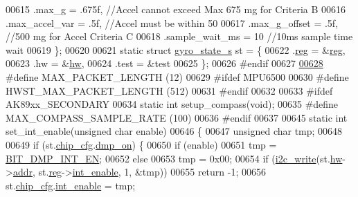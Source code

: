 \begin{DoxyCode}
{{00615     .max\_g          = .675f, \textcolor{comment}{//Accel cannot exceed Max 675 mg for Criteria B}
00616     .max\_accel\_var  = .5f,  \textcolor{comment}{//Accel must be within 50%
00617     .max\_g\_offset   = .5f,   \textcolor{comment}{//500 mg for Accel Criteria C}
00618     .sample\_wait\_ms = 10    \textcolor{comment}{//10ms sample time wait}
00619 \};
00620 
00621 \textcolor{keyword}{static} \textcolor{keyword}{struct }\hyperlink{structgyro__state__s}{gyro\_state\_s} st = \{
00622     .\hyperlink{structgyro__state__s_ae857e1285c583b7438a208edd691a38e}{reg} = &\hyperlink{inv__mpu_8c_a5448c351fc95ff052b110eee80e5f75c}{reg},
00623     .hw = &\hyperlink{inv__mpu_8c_a7fefd0bb47e09b7e39e25e9795cd7edc}{hw},
00624     .test = &test
00625 \};
00626 \textcolor{preprocessor}{#endif}
00627 
\hypertarget{inv__mpu_8c_source.tex_l00628}{}\hyperlink{inv__mpu_8c_a973c680573b37fc359fc68d0707da355}{00628} \textcolor{preprocessor}{#define MAX\_PACKET\_LENGTH (12)}
00629 \textcolor{preprocessor}{#ifdef MPU6500}
00630 \textcolor{preprocessor}{#define HWST\_MAX\_PACKET\_LENGTH (512)}
00631 \textcolor{preprocessor}{#endif}
00632 
00633 \textcolor{preprocessor}{#ifdef AK89xx\_SECONDARY}
00634 \textcolor{keyword}{static} \textcolor{keywordtype}{int} setup\_compass(\textcolor{keywordtype}{void});
00635 \textcolor{preprocessor}{#define MAX\_COMPASS\_SAMPLE\_RATE (100)}
00636 \textcolor{preprocessor}{#endif}
00637 
00645 \textcolor{keyword}{static} \textcolor{keywordtype}{int} set\_int\_enable(\textcolor{keywordtype}{unsigned} \textcolor{keywordtype}{char} enable)
00646 \{
00647     \textcolor{keywordtype}{unsigned} \textcolor{keywordtype}{char} tmp;
00648 
00649     \textcolor{keywordflow}{if} (st.\hyperlink{structgyro__state__s_ac895217592e2084bd520b0be8e9d20ee}{chip\_cfg}.\hyperlink{structchip__cfg__s_a49fb51079238683b21264827348b5968}{dmp\_on}) \{
00650         \textcolor{keywordflow}{if} (enable)
00651             tmp = \hyperlink{inv__mpu_8c_a4dc5309ed09fc683d8e5a247feaad69d}{BIT\_DMP\_INT\_EN};
00652         \textcolor{keywordflow}{else}
00653             tmp = 0x00;
00654         \textcolor{keywordflow}{if} (\hyperlink{_i2_c_8c_ac0f145afe8d662af199043939f4398d6}{i2c\_write}(st.\hyperlink{structgyro__state__s_a5bac30a96752691e4cc723735060e360}{hw}->\hyperlink{structhw__s_a4c34a946600e9d68b6355d23f54d291b}{addr}, st.\hyperlink{structgyro__state__s_ae857e1285c583b7438a208edd691a38e}{reg}->\hyperlink{structgyro__reg__s_ab0cc290f4f43cd8a8b6562a97f540493}{int\_enable}, 1, &tmp))
00655             \textcolor{keywordflow}{return} -1;
00656         st.\hyperlink{structgyro__state__s_ac895217592e2084bd520b0be8e9d20ee}{chip\_cfg}.\hyperlink{structchip__cfg__s_ab0cc290f4f43cd8a8b6562a97f540493}{int\_enable} = tmp;
}}}
\end{DoxyCode}
